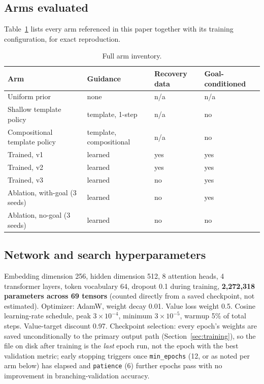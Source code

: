 \documentclass[11pt]{article}
\numberwithin{equation}{section}
\begin{document}
\subsection{Arms evaluated}
Table~\ref{tab:arms} lists every arm referenced in this paper together with its training configuration, for exact reproduction.

\begin{table}[H]
\centering
\small
\begin{tabular}{@{}llll@{}}
\toprule
Arm & Guidance & Recovery data & Goal-conditioned \\
\midrule
Uniform prior & none & n/a & n/a \\
Shallow template policy & template, 1-step & n/a & no \\
Compositional template policy & template, compositional & n/a & no \\
Trained, v1 & learned & yes & yes \\
Trained, v2 & learned & yes & yes \\
Trained, v3 & learned & no & yes \\
Ablation, with-goal (3 seeds) & learned & no & yes \\
Ablation, no-goal (3 seeds) & learned & no & no \\
\bottomrule
\end{tabular}
\caption{Full arm inventory.}
\label{tab:arms}
\end{table}

\subsection{Network and search hyperparameters}
Embedding dimension 256, hidden dimension 512, 8 attention heads, 4 transformer layers, token vocabulary 64, dropout 0.1 during training, \textbf{2{,}272{,}318 parameters across 69 tensors} (counted directly from a saved checkpoint, not estimated). Optimizer: AdamW, weight decay 0.01. Value loss weight 0.5. Cosine learning-rate schedule, peak $3\times10^{-4}$, minimum $3\times10^{-5}$, warmup 5\% of total steps. Value-target discount 0.97. Checkpoint selection: every epoch's weights are saved unconditionally to the primary output path (Section~\ref{sec:training}), so the file on disk after training is the \emph{last} epoch run, not the epoch with the best validation metric; early stopping triggers once \texttt{min\_epochs} (12, or as noted per arm below) has elapsed and \texttt{patience} (6) further epochs pass with no improvement in branching-validation accuracy.
\end{document}

